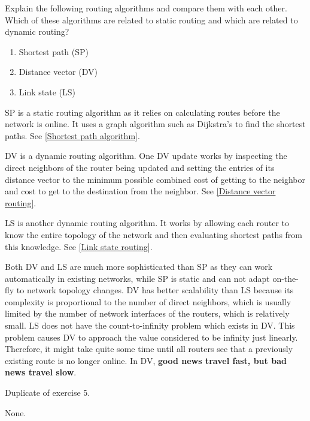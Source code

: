 \begin{Exercise}
Explain the following routing algorithms and compare them with each other.
Which of these algorithms are related to static routing and which are related to dynamic routing?

\begin{enumerate}
    \item Shortest path (SP)
    \item Distance vector (DV)
    \item Link state (LS)
\end{enumerate}
\end{Exercise}
\begin{Answer}
SP is a static routing algorithm as it relies on calculating routes before the network is online.
It uses a graph algorithm such as Dijkstra's to find the shortest paths. See \ref{Shortest path algorithm}.

DV is a dynamic routing algorithm. One DV update works by inspecting the direct neighbors of the router being updated and setting the entries of its distance vector to the minimum possible combined cost of getting to the neighbor and cost to get to the destination from the neighbor. See \ref{Distance vector routing}.

LS is another dynamic routing algorithm. It works by allowing each router to know the entire topology of the network and then evaluating shortest paths from this knowledge. See \ref{Link state routing}.

Both DV and LS are much more sophisticated than SP as they can work automatically in existing networks, while SP is static and can not adapt on-the-fly to network topology changes.
DV has better scalability than LS because its complexity is proportional to the number of direct neighbors, which is usually limited by the number of network interfaces of the routers, which is relatively small.
LS does not have the count-to-infinity problem which exists in DV. This problem causes DV to approach the value considered to be infinity just linearly. Therefore, it might take quite some time until all routers see that a previously existing route is no longer online. In DV, \textbf{good news travel fast, but bad news travel slow}.
\end{Answer}

\begin{Exercise}
Duplicate of exercise 5.
\end{Exercise}
\begin{Answer}
None.
\end{Answer}

